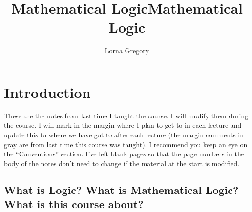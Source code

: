 \documentclass[11pt]{article}
\title{Mathematical Logic}
\author{Lorna Gregory}
\title{Mathematical Logic}
\newcommand{\Vbl}{\textrm{Vbl}}
\newcommand{\mcal}[1]{\mathcal{#1}}
\newcommand{\N}{\mathbb{N}}
\newcommand{\st}{\ \vert \ }
\begin{document}
\maketitle
\tableofcontents

%
%
%
%
%
%
%
%
%
%
%
%
%
%
%
%
%
%
%
%
%

\section{Introduction}
These are the notes from last time I taught the course. I will modify them during the course. I will mark in the margin where I plan to get to in each lecture and update this to where we have got to after each lecture (the margin comments in gray are from last time this course was taught). I recommend you keep an eye on the ``Conventions'' section. I've left blank pages so that the page numbers in the body of the notes don't need to change if the material at the start is modified.

\subsection*{What is Logic? What is Mathematical Logic? What is this course about?}
\end{document}

